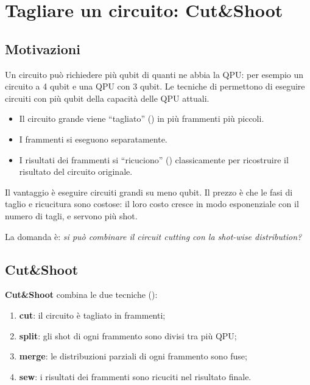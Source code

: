 \section{Tagliare un circuito: Cut\&Shoot}
\label{sec:qse-cut}

\subsection{Motivazioni}

Un circuito può richiedere più qubit di quanti ne abbia la QPU: per esempio un circuito a 4 qubit e una QPU con 3
qubit. Le tecniche di  permettono di eseguire circuiti con più qubit della capacità delle QPU
attuali.
\begin{itemize}
  \item Il circuito grande viene ``tagliato'' () in più frammenti più piccoli.
  \item I frammenti si eseguono separatamente.
  \item I risultati dei frammenti si ``ricuciono'' () classicamente per ricostruire il risultato del circuito
    originale.
\end{itemize}
Il vantaggio è eseguire circuiti grandi su meno qubit. Il prezzo è che le fasi di taglio e ricucitura sono costose:
il loro costo cresce in modo esponenziale con il numero di tagli, e servono più shot.

La domanda è: \emph{si può combinare il circuit cutting con la shot-wise distribution?}

\subsection{Cut\&Shoot}

\textbf{Cut\&Shoot} combina le due tecniche ():
\begin{enumerate}
  \item \textbf{cut}: il circuito è tagliato in frammenti;
  \item \textbf{split}: gli shot di ogni frammento sono divisi tra più QPU;
  \item \textbf{merge}: le distribuzioni parziali di ogni frammento sono fuse;
  \item \textbf{sew}: i risultati dei frammenti sono ricuciti nel risultato finale.
\end{enumerate}

